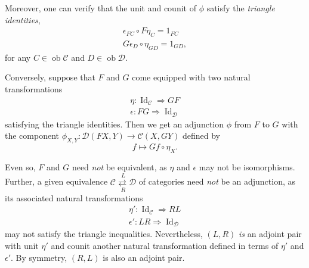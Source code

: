 \documentclass[10pt,letterpaper,cm]{nupset}
\theoremstyle{definition}
\theoremstyle{theorem}
\theoremstyle{remark}
\newcommand{\1}{\mathbf{1}}
\renewcommand{\c}{\mathscr{C}}
\renewcommand{\d}{\mathscr{D}}
\newcommand{\0}{\vec 0}
\DeclareMathOperator{\id}{Id}
\DeclareMathOperator{\ob}{ob}
\begin{document}
Moreover, one can verify that the unit and counit of $\phi$ satisfy the \textit{triangle identities},
\begin{gather*}
\epsilon_{F{C}} \circ F \eta_{C}=1_{F{C}}
\\ G \epsilon_{D} \circ \eta_{G{D}}=1_{G{D}},
\end{gather*}
for any $C\in \ob{\c}$ and $D\in \ob{\d}$.

\smallskip

Conversely, suppose that $F$ and $G$ come equipped with two natural transformations
\begin{gather*}
\eta: \id_{\c} \Rightarrow GF
\\ \epsilon: FG \Rightarrow \id_{\d}
\end{gather*}
satisfying the triangle identities. Then we get an adjunction $\phi$ from $F$ to $G$ with the component $\phi_{X, Y} : \d(F{X}, Y) \to \c(X, G{Y})$ defined by
\[
f \mapsto G{f} \circ \eta_X.
\] 

\smallskip

Even so, $F$ and $G$ need \emph{not} be equivalent, as $\eta$ and $\epsilon$ may not be isomorphisms. Further, a given equivalence $\overset{L}{\underset{R}{\c \rightleftarrows \d}}$ of categories need \emph{not} be an adjunction, as its associated natural transformations
\begin{gather*}
\eta': \id_{\c} \Rightarrow RL
\\ \epsilon': LR \Rightarrow \id_{\d}
\end{gather*}
may not satisfy the triangle inequalities. Nevertheless, $\left(L, R\right)$ \emph{is} an adjoint pair with unit $\eta'$ and counit another natural transformation defined in terms of $\eta'$ and $\epsilon'$. By symmetry, $\left(R, L\right)$ is also an adjoint pair.
\end{document}
